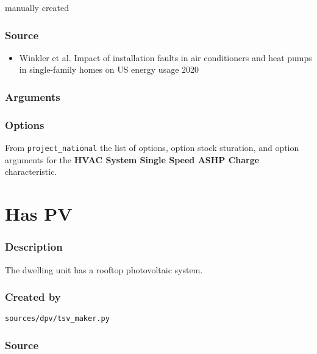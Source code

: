 manually created

\subsubsection{Source}\label{source-83}

\begin{itemize}
 
\item
  Winkler et al. \textquotesingle Impact of installation faults in air
  conditioners and heat pumps in single-family homes on US energy
  usage\textquotesingle{} 2020
\end{itemize}

\subsubsection{Arguments}\label{arguments-53}



\subsubsection{Options}\label{options-84}

From \texttt{project\_national} the list of options, option stock
sturation, and option arguments for the \textbf{HVAC System Single Speed
ASHP Charge} characteristic.



\section{Has PV}\label{has_pv}

\subsubsection{Description}\label{description-85}

The dwelling unit has a rooftop photovoltaic system.

\subsubsection{Created by}\label{created-by-85}

\texttt{sources/dpv/tsv\_maker.py}

\subsubsection{Source}\label{source-84}

